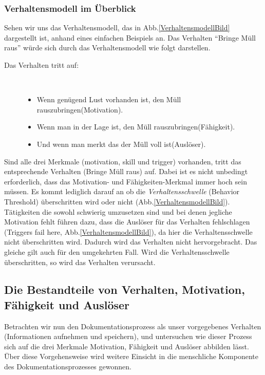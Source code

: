 \documentclass[a4paper,12pt]{scrartcl}
\begin{document}
\subsubsection{Verhaltensmodell im Überblick}
Sehen wir uns das Verhaltensmodell, das in Abb.\ref{VerhaltensmodellBild} dargestellt ist, anhand eines einfachen Beispiels an. Das Verhalten \enquote{Bringe Müll raus} würde sich durch das Verhaltensmodell wie folgt darstellen. 
\begin{description}
   \item[Das Verhalten tritt auf:]~\par
   \begin{itemize}
      \item Wenn genügend Lust vorhanden ist, den Müll rauszubringen(Motivation).
      \item Wenn man in der Lage ist, den Müll rauszubringen(Fähigkeit).
      \item Und wenn man merkt das der Müll voll ist(Auslöser).
   \end{itemize}
\end{description}  
Sind alle drei Merkmale (motivation, skill und trigger) vorhanden, tritt das entsprechende Verhalten (Bringe Müll raus) auf. Dabei ist es nicht unbedingt erforderlich, dass das Motivation- und Fähigkeiten-Merkmal immer hoch sein müssen. Es kommt lediglich darauf an ob die \textit{Verhaltensschwelle} (Behavior Threshold) überschritten wird oder nicht (Abb.\ref{VerhaltensmodellBild}). Tätigkeiten die sowohl schwierig umzusetzen sind und bei denen jegliche Motivation fehlt führen dazu, dass die Auslöser für das Verhalten fehlschlagen (Triggers fail here, Abb.\ref{VerhaltensmodellBild}), da hier die Verhaltensschwelle nicht überschritten wird. Dadurch wird das Verhalten nicht hervorgebracht. Das gleiche gilt auch für den umgekehrten Fall. Wird die Verhaltensschwelle überschritten, so wird das Verhalten verursacht. 

\subsection{Die Bestandteile von Verhalten, Motivation, Fähigkeit und Auslöser}
Betrachten wir nun den Dokumentationsprozess als unser vorgegebenes Verhalten (Informationen aufnehmen und speichern), und untersuchen wie dieser Prozess sich auf die drei Merkmale Motivation, Fähigkeit und Auslöser abbilden lässt. Über diese Vorgehensweise wird weitere Einsicht in die menschliche Komponente des Dokumentationsprozesses gewonnen.
\end{document}
